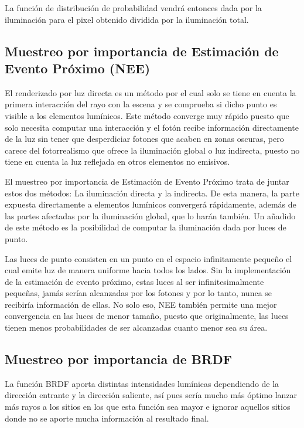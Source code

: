 La función de distribución de probabilidad vendrá entonces dada por la iluminación para el pixel obtenido dividida por la iluminación total.


\subsection{Muestreo por importancia de Estimación de Evento Próximo (NEE)}



El renderizado por luz directa es un método por el cual solo se tiene en cuenta la primera interacción del rayo con la escena y se comprueba si dicho punto es visible a los elementos lumínicos. Este método converge muy rápido puesto que solo necesita computar una interacción y el fotón recibe información directamente de la luz sin tener que desperdiciar fotones que acaben en zonas oscuras, pero carece del fotorrealismo que ofrece la iluminación global o luz indirecta, puesto no tiene en cuenta la luz reflejada en otros elementos no emisivos.

El muestreo por importancia de Estimación de Evento Próximo trata de juntar estos dos métodos: La iluminación directa y la indirecta. De esta manera, la parte expuesta directamente a elementos lumínicos convergerá rápidamente, además de las partes afectadas por la iluminación global, que lo harán también. Un añadido de este método es la posibilidad de computar la iluminación dada por luces de punto.

Las luces de punto consisten en un punto en el espacio infinitamente pequeño el cual emite luz de manera uniforme hacia todos los lados. Sin la implementación de la estimación de evento próximo, estas luces al ser infinitesimalmente pequeñas, jamás serían alcanzadas por los fotones y por lo tanto, nunca se recibiría información de ellas. No solo eso, NEE también permite una mejor convergencia en las luces de menor tamaño, puesto que originalmente, las luces tienen menos probabilidades de ser alcanzadas cuanto menor sea su área.


\subsection{Muestreo por importancia de BRDF}

La función BRDF aporta distintas intensidades lumínicas dependiendo de la dirección entrante y la dirección saliente, así pues sería mucho más óptimo lanzar más rayos a los sitios en los que esta función sea mayor e ignorar aquellos sitios donde no se aporte mucha información al resultado final.

